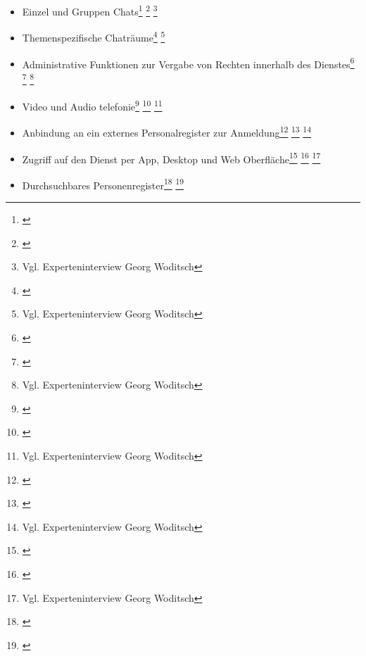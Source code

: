\begin{itemize}
    \item Einzel und Gruppen Chats\footnote{\cite{Slack2020}} \footnote{\cite{Microsoft2020}} \footnote{Vgl. Experteninterview Georg Woditsch}
    \item Themenspezifische Chaträume\footnote{\cite{Slack2020}} \footnote{Vgl. Experteninterview Georg Woditsch}
    \item Administrative Funktionen zur Vergabe von Rechten innerhalb des Dienstes\footnote{\cite{Slack2020}} \footnote{\cite{Microsoft2020}} \footnote{Vgl. Experteninterview Georg Woditsch}
    \item Video und Audio telefonie\footnote{\cite{Slack2020}} \footnote{\cite{Microsoft2020}} \footnote{Vgl. Experteninterview Georg Woditsch}
    \item Anbindung an ein externes Personalregister zur Anmeldung\footnote{\cite{Slack2020}} \footnote{\cite{Microsoft2020}} \footnote{Vgl. Experteninterview Georg Woditsch}
    \item Zugriff auf den Dienst per App, Desktop und Web Oberfläche\footnote{\cite{Slack2020}} \footnote{\cite{Microsoft2020}} \footnote{Vgl. Experteninterview Georg Woditsch}
    \item Durchsuchbares Personenregister\footnote{\cite{Slack2020}} \footnote{\cite{Microsoft2020}}
\end{itemize}
